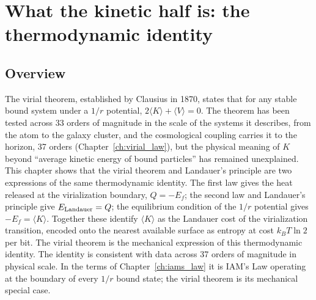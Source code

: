 
\chapter{What the kinetic half is: the thermodynamic identity}\label{ch:virial_identity}

\section*{Overview}
The virial theorem, established by Clausius in 1870, states that for any stable bound system under a $1/r$ potential, $2\langle K\rangle+\langle V\rangle=0$.
The theorem has been tested across 33 orders of magnitude in the scale of the systems it describes, from the atom to the galaxy cluster, and the cosmological coupling carries it to the horizon, 37 orders (Chapter~\ref{ch:virial_law}), but the physical meaning
of $K$ beyond ``average kinetic energy of bound particles'' has remained unexplained. This chapter shows that the virial theorem and Landauer's principle
are two expressions of the same thermodynamic identity. The first law gives the heat released at the virialization boundary, $Q=-E_f$; the second law and
Landauer's principle give $E_{\rm Landauer}=Q$; the equilibrium condition of the $1/r$ potential gives $-E_f=\langle K\rangle$. Together these identify
$\langle K\rangle$ as the Landauer cost of the virialization transition, encoded onto the nearest available surface as entropy at cost $k_BT\ln2$ per bit.
The virial theorem is the mechanical expression of this thermodynamic identity. The identity is consistent with data across 37 orders of magnitude in
physical scale. In the terms of Chapter~\ref{ch:iams_law} it is IAM's Law operating at the boundary of every $1/r$ bound state; the virial
theorem is its mechanical special case.

